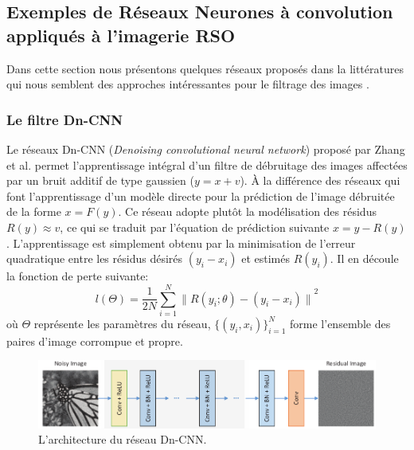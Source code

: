 \subsection{Exemples de Réseaux Neurones à convolution appliqués à l'imagerie RSO}

Dans cette section nous présentons quelques réseaux proposés dans la littératures qui nous semblent des approches intéressantes pour le filtrage des images \acrsar.

\subsubsection{Le filtre  Dn-CNN}

Le réseaux Dn-CNN (\textit{Denoising convolutional neural network}) proposé par Zhang et al. \cite{Zhang2017} permet l'apprentissage intégral d'un filtre de débruitage des images affectées par un bruit additif de type gaussien ($y=x+v$). À la différence des réseaux qui font l'apprentissage d'un modèle directe pour la prédiction de l'image débruitée de la forme $x = F(y)$.  Ce réseau adopte plutôt la modélisation des résidus $R(y) \approx v$, ce qui se traduit par l'équation de prédiction suivante $x=y-R(y)$. L'apprentissage est simplement obtenu par la minimisation de l'erreur quadratique entre les résidus désirés $(y_i-x_i)$ et estimés  $R(y_i)$.  Il en découle la fonction de perte suivante:
\begin{equation}
    l(\Theta)=\frac{1}{2N}\sum_{i=1}^{N}{\parallel R(y_i;\theta) - (y_i-x_i)\parallel}^2
    \label{eq:residual_cost}
\end{equation}
où $\Theta$ représente les paramètres du réseau, $\{(y_i, x_i)\}_{i=1}^{N}$ forme l'ensemble des paires d'image corrompue et propre.

\begin{figure}
  \includegraphics[width=\linewidth]{figures/geo6393/Dn-CNN.png}
   \centering
  \caption{L'architecture du réseau Dn-CNN.}
  \label{fig:DnCNN}
\end{figure}

